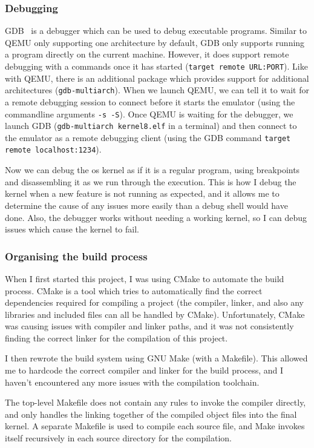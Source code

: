 \documentclass{article}
\begin{document}
\subsubsection{Debugging}
GDB~\cite{gdb} is a debugger which can be used to debug executable programs.
Similar to QEMU only supporting one architecture by default, GDB only supports
running a program directly on the current machine. However, it does support
remote debugging with a commands once it has started (\texttt{target remote
URL:PORT}). Like with QEMU, there is an additional package which provides
support for additional architectures (\texttt{gdb-multiarch}). When we launch
QEMU, we can tell it to wait for a remote debugging session to connect before
it starts the emulator (using the commandline arguments \texttt{-s -S}). Once
QEMU is waiting for the debugger, we launch GDB (\texttt{gdb-multiarch
kernel8.elf} in a terminal) and then connect to the emulator as a remote
debugging client (using the GDB command \texttt{target remote localhost:1234}).

Now we can debug the \gls{os} kernel as if it is a regular program, using
breakpoints and disassembling it as we run through the execution. This is how I
debug the kernel when a new feature is not running as expected, and it allows
me to determine the cause of any issues more easily than a debug shell would
have done. Also, the debugger works without needing a working kernel, so I can
debug issues which cause the kernel to fail.

\subsubsection{Organising the build process}
When I first started this project, I was using CMake to automate the build
process. CMake is a tool which tries to automatically find the correct
dependencies required for compiling a project (the compiler, linker, and also
any libraries and included files can all be handled by CMake). Unfortunately,
CMake was causing issues with compiler and linker paths, and it was not
consistently finding the correct linker for the compilation of this project.

I then rewrote the build system using GNU Make (with a Makefile). This allowed
me to hardcode the correct compiler and linker for the build process, and I
haven't encountered any more issues with the compilation toolchain.

The top-level Makefile does not contain any rules to invoke the compiler
directly, and only handles the linking together of the compiled object files
into the final kernel. A separate Makefile is used to compile each source file,
and Make invokes itself recursively in each source directory for the
compilation.
\end{document}
